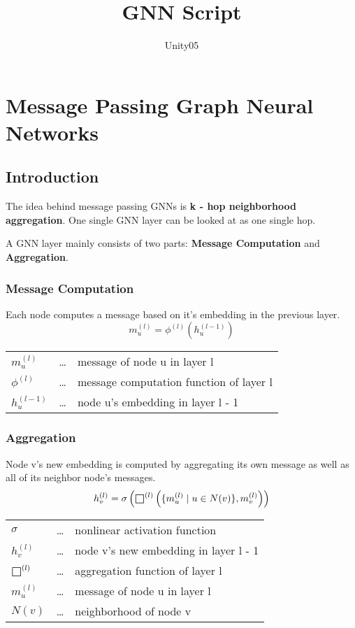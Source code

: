 \documentclass[parskip=full]{scrartcl}
\title{GNN Script}
\author{Unity05}
\def\msquare{\mathord{\scalerel*{\Box}{gX}}}
\begin{document}
\begin{titlepage}
\maketitle
\end{titlepage}

\section{Message Passing Graph Neural Networks}

\subsection{Introduction}
The idea behind message passing GNNs is \textbf{k - hop neighborhood aggregation}.
One single GNN layer can be looked at as one single hop.

A GNN layer mainly consists of two parts: \textbf{Message Computation} and \textbf{Aggregation}.

\subsubsection{Message Computation}
Each node computes a message based on it's embedding in the previous layer.
\[m_u^{(l)} = \phi^{(l)}\left(h_u^{(l-1)}\right)\]
\begin{center}
\begin{tabular}{l c l}
	$m_u^{(l)}$ & \dots & message of node u in layer l \\
	$\phi^{(l)}$ & \dots & message computation function of layer l \\
	$h_u^{(l - 1)}$ & \dots & node u's embedding in layer l - 1
\end{tabular}
\end{center}

\subsubsection{Aggregation}
Node v's new embedding is computed by aggregating its own message as well as all of its neighbor node's messages.
\[h_v^{(l)} = \sigma\left(\msquare^{(l)}\left(\{m_u^{(l)} \mid u \in N(v)\}, m_v^{(l)}\right)\right)\]
\begin{center}
\begin{tabular}{l c l}
	$\sigma$ & \dots & nonlinear activation function \\
	$h_v^{(l)}$ & \dots & node v's new embedding in layer l - 1 \\
	$\msquare^{(l)}$ & \dots & aggregation function of layer l \\
	$m_u^{(l)}$ & \dots & message of node u in layer l \\
	$N(v)$ & \dots & neighborhood of node v
\end{tabular}
\end{center}
\end{document}
